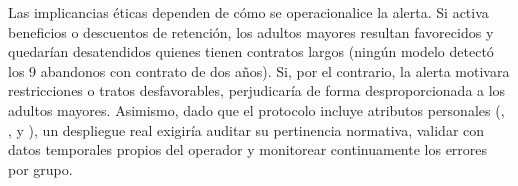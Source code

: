 Las implicancias éticas dependen de cómo se operacionalice la alerta. Si activa beneficios o
descuentos de retención, los adultos mayores resultan favorecidos y quedarían desatendidos quienes
tienen contratos largos (ningún modelo detectó los 9 abandonos con contrato de dos años). Si, por el
contrario, la alerta motivara restricciones o tratos desfavorables, perjudicaría de forma
desproporcionada a los adultos mayores. Asimismo, dado que el protocolo incluye atributos personales
(, ,  y ), un despliegue real exigiría
auditar su pertinencia normativa, validar con datos temporales propios del operador y monitorear
continuamente los errores por grupo.
